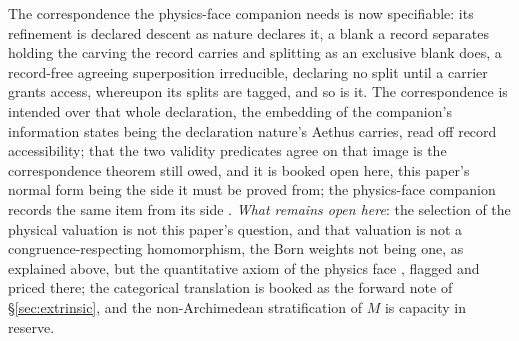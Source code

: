 The correspondence the physics-face companion needs is now specifiable: its refinement is declared descent as nature declares it, a blank a record separates holding the carving the record carries and splitting as an exclusive blank does, a record-free agreeing superposition irreducible, declaring no split until a carrier grants access, whereupon its splits are tagged, and so is it. The correspondence is intended over that whole declaration, the embedding of the companion's information states being the declaration nature's Aethus carries, read off record accessibility; that the two validity predicates agree on that image is the correspondence theorem still owed, and it is booked open here, this paper's normal form being the side it must be proved from; the physics-face companion records the same item from its side \cite{AethusQuant}. \emph{What remains open here}: the selection of the physical valuation is not this paper's question, and that valuation is not a congruence-respecting homomorphism, the Born weights not being one, as explained above, but the quantitative axiom of the physics face \cite{AethusQuant}, flagged and priced there; the categorical translation is booked as the forward note of §\ref{sec:extrinsic}, and the non-Archimedean stratification of $M$ is capacity in reserve.

